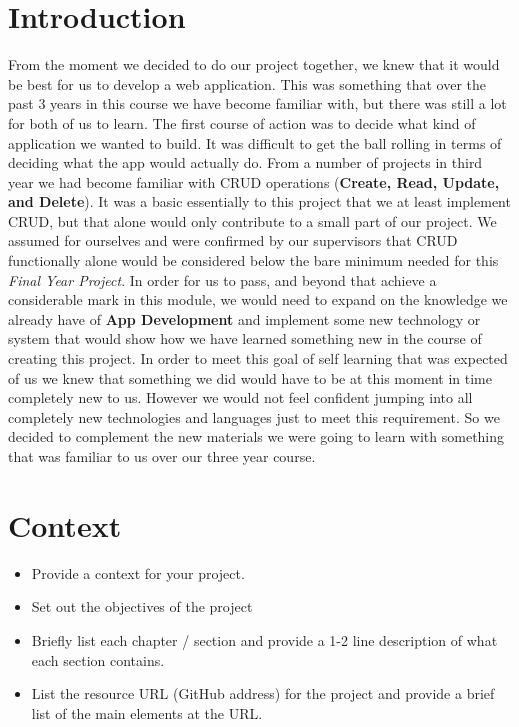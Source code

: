 \chapter{Introduction}
From the moment we decided to do our project together, we knew that it would be best for us to develop a web application. This was something that over the past 3 years in this course we have become familiar with, but there was still a lot for both of us to learn. The first course of action was to decide what kind of application we wanted to build. It was difficult to get the ball rolling in terms of deciding what the app would actually do. From a number of projects in third year we had become familiar with CRUD operations (\textbf{Create, Read, Update, and Delete}). It was a basic essentially to this project that we at least implement CRUD, but that alone would only contribute to a small part of our project. We assumed for ourselves and were confirmed by our supervisors that CRUD functionally alone would be considered below the bare minimum needed for this \emph{Final Year Project}. In order for us to pass, and beyond that achieve a considerable mark in this module, we would need to expand on the knowledge we already have of \textbf{App Development} and implement some new technology or system that would show how we have learned something new in the course of creating this project. In order to meet this goal of self learning that was expected of us we knew that something we did would have to be at this moment in time completely new to us. However we would not feel confident jumping into all completely new technologies and languages just to meet this requirement. So we decided to complement the new materials we were going to learn with something that was familiar to us over our three year course.\newline\newline

\chapter{Context}
\begin{itemize}
\item Provide a context for your project.
\item Set out the objectives of the project
\item Briefly list each chapter / section and provide a 1-2 line description of what each section contains.
\item List the resource URL (GitHub address) for the project and provide a brief list of the main elements at the URL.
\end{itemize}

